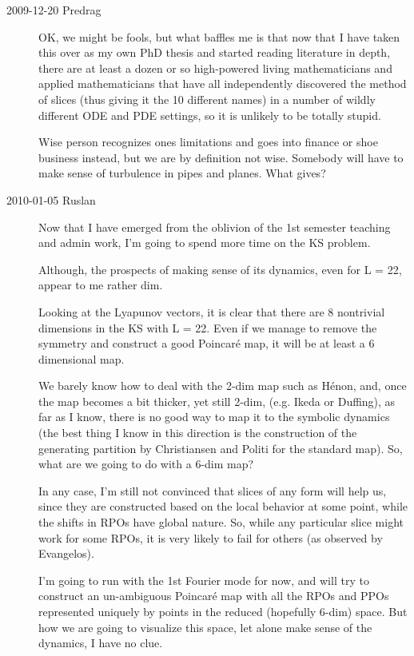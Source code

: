 \begin{description}
\item[2009-12-20 Predrag]
	OK, we might be fools, but what baffles me is that now
that I have taken this over as my own PhD thesis and started
reading literature in depth, there are at least a dozen or so
high-powered living mathematicians and applied mathematicians
that have all independently discovered the method of slices
(thus giving it the 10 different names) in a number of wildly
different ODE and PDE settings, so it is unlikely to be
totally stupid.

Wise person recognizes ones limitations and goes into finance
or shoe business instead, but we are by definition not wise.
Somebody will have to make sense of turbulence in pipes and
planes. What gives?

\item[2010-01-05 Ruslan] Now that I have emerged from the
oblivion of the 1st semester teaching and admin work, I'm
going to spend more time on the KS problem.

Although, the prospects of making sense of its dynamics, even
for L = 22, appear to me rather dim.

Looking at the Lyapunov vectors, it is clear that there are 8
nontrivial dimensions in the KS with L = 22.  Even if we
manage to remove the symmetry and construct a good Poincar\'e
map, it will be at least a 6 dimensional map.

We barely know how to deal with the 2-dim map such as H\'enon,
and, once the map becomes a bit thicker, yet still 2-dim,
(e.g. Ikeda or Duffing), as far as I know, there is no good
way to map it to the symbolic dynamics (the best thing I know
in this direction is the construction of the generating
partition by Christiansen and Politi for the standard map).
So, what are we going to do with a 6-dim map?

In any case, I'm still not convinced that slices of any form
will help us, since they are constructed based on the local
behavior at some point, while the shifts in RPOs have global
nature.  So, while any particular slice might work for some
RPOs, it is very likely to fail for others (as observed by
Evangelos).

I'm going to run with the 1st Fourier mode for now, and will
try to construct an un-ambiguous Poincar\'e map with all the
RPOs and PPOs represented uniquely by points in the reduced
(hopefully 6-dim) space. But how we are going to visualize
this space, let alone make sense of the dynamics, I have no
clue.

\end{description}


